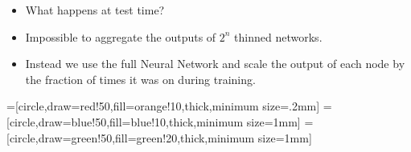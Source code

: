\begin{frame}
	\begin{itemize}
		\item<2-> What happens at test time?
		\item<3-> Impossible to aggregate the outputs of $2^n$ thinned networks.
		\item<4-> Instead we use the full Neural Network and scale the output of each node by the fraction of times it was on during training.
	\end{itemize}
						
\end{frame}
				
\begin{frame}
	=[circle,draw=red!50,fill=orange!10,thick,minimum size=.2mm]
	=[circle,draw=blue!50,fill=blue!10,thick,minimum size=1mm]
	=[circle,draw=green!50,fill=green!20,thick,minimum size=1mm]
						

\end{frame}
